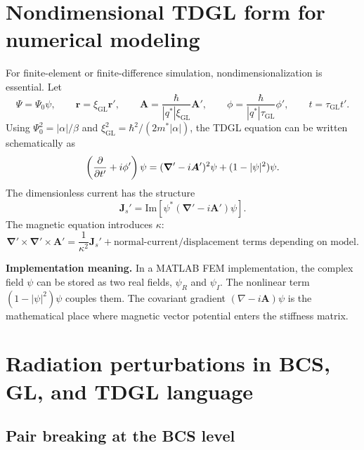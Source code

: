 \documentclass[11pt]{article}
\numberwithin{equation}{section}
\newcommand{\rvec}{\bm{r}}
\newcommand{\Avec}{\bm{A}}
\newcommand{\Jvec}{\bm{J}}
\renewcommand{\grad}{\bm{\nabla}}
\newcommand{\xiGL}{\xi_{\mathrm{GL}}}
\newcommand{\Ord}{\Psi}
\begin{document}
\section{Nondimensional TDGL form for numerical modeling}

For finite-element or finite-difference simulation, nondimensionalization is essential. Let
\begin{equation}
\Ord=\Ord_0\psi,
\qquad
\rvec=\xiGL\rvec',
\qquad
\Avec=\frac{\hbar}{|q^*|\xiGL}\Avec',
\qquad
\phi=\frac{\hbar}{|q^*|\tau_{\mathrm{GL}}}\phi',
\qquad
 t=\tau_{\mathrm{GL}}t'.
\end{equation}
Using $\Ord_0^2=|\alpha|/\beta$ and $\xiGL^2=\hbar^2/(2m^*|\alpha|)$, the TDGL equation can be written schematically as
\begin{equation}
\left(\pdv{}{t'}+i\phi'\right)\psi=(\grad'-i\Avec')^2\psi+(1-|\psi|^2)\psi.
\label{eq:dimensionless_tdgl}
\end{equation}
The dimensionless current has the structure
\begin{equation}
\Jvec_s' = \mathrm{Im}\left[\psi^*(\grad'-i\Avec')\psi\right].
\end{equation}
The magnetic equation introduces $\kappa$:
\begin{equation}
\grad'\times\grad'\times\Avec'=\frac{1}{\kappa^2}\Jvec_s' + \text{normal-current/displacement terms depending on model}.
\end{equation}

\begin{physicsbox}
\textbf{Implementation meaning.} In a MATLAB FEM implementation, the complex field $\psi$ can be stored as two real fields, $\psi_R$ and $\psi_I$. The nonlinear term $(1-|\psi|^2)\psi$ couples them. The covariant gradient $(\nabla-i\Avec)\psi$ is the mathematical place where magnetic vector potential enters the stiffness matrix.
\end{physicsbox}

\section{Radiation perturbations in BCS, GL, and TDGL language}

\subsection{Pair breaking at the BCS level}
\end{document}

